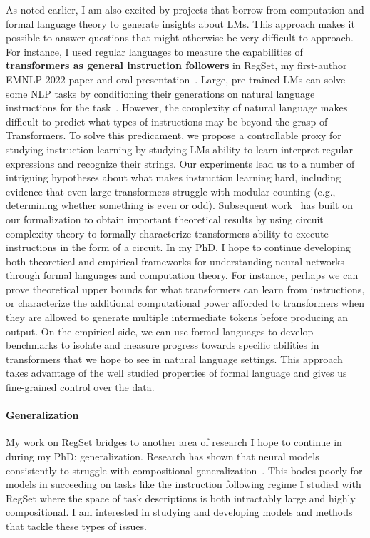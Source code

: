 \documentclass[11pt]{article}
\begin{document}
As noted earlier, I am also excited by projects 
that borrow from computation and formal language theory
to generate insights about LMs.
This approach makes it possible to answer 
questions that might otherwise be very difficult to approach.
For instance, I used regular languages
to measure the capabilities of 
\textbf{transformers as general instruction followers}
in RegSet, my first-author EMNLP 2022 paper 
and oral presentation~\cite{Finlayson2022WhatMI}. 
Large, pre-trained LMs can solve some NLP tasks 
by conditioning their generations on natural language instructions 
for the task~\cite{mishra2021crosstask, Wei2021FinetunedLM}. 
However, the complexity of natural language makes difficult to
predict what types of instructions may be beyond the grasp of Transformers.
To solve this predicament, 
we propose a controllable proxy for studying instruction learning
by studying LMs ability to learn interpret regular expressions
and recognize their strings.
Our experiments lead us to a number of intriguing hypotheses 
about what makes instruction learning hard, 
including evidence that even large transformers struggle with modular counting 
(e.g., determining whether something is even or odd). 
Subsequent work~\cite{Merrill2022LogPrecisionTA} 
has built on our formalization 
to obtain important theoretical results
by using circuit complexity theory
to formally characterize transformers ability to execute instructions in the form of a circuit.
In my PhD, I hope to continue developing both theoretical and empirical frameworks 
for understanding neural networks through formal languages and computation theory.
For instance, perhaps we can prove theoretical upper bounds 
for what transformers can learn from instructions,
or characterize the additional computational power 
afforded to transformers 
when they are allowed to generate multiple intermediate tokens 
before producing an output.\footnotemark
{}
On the empirical side, we can use formal languages to develop benchmarks 
to isolate and measure progress towards specific abilities 
in transformers that we hope to see in natural language settings.
This approach takes advantage of the well studied properties of formal language
and gives us fine-grained control over the data.

\paragraph{Generalization}
My work on RegSet bridges to another area of research I hope to continue in during my PhD: generalization.
Research has shown that neural models consistently to struggle with
compositional generalization~\cite{Lake2018GeneralizationWS}. 
This bodes poorly for models in succeeding on tasks  
like the instruction following regime I studied with RegSet 
where the space of task descriptions is both intractably large 
and highly compositional.
I am interested in studying and developing models and methods
that tackle these types of issues.
\end{document}
